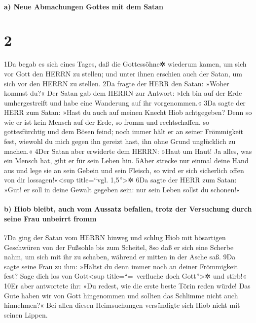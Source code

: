 \hypertarget{a-neue-abmachungen-gottes-mit-dem-satan}{%
\paragraph{a) Neue Abmachungen Gottes mit dem
Satan}\label{a-neue-abmachungen-gottes-mit-dem-satan}}

\hypertarget{section-1}{%
\section{2}\label{section-1}}

1Da begab es sich eines Tages, daß die Gottessöhne✲ wiederum kamen, um
sich vor Gott den HERRN zu stellen; und unter ihnen erschien auch der
Satan, um sich vor den HERRN zu stellen. 2Da fragte der HERR den Satan:
»Woher kommst du?« Der Satan gab dem HERRN zur Antwort: »Ich bin auf der
Erde umhergestreift und habe eine Wanderung auf ihr vorgenommen.« 3Da
sagte der HERR zum Satan: »Hast du auch auf meinen Knecht Hiob
achtgegeben? Denn so wie er ist kein Mensch auf der Erde, so fromm und
rechtschaffen, so gottesfürchtig und dem Bösen feind; noch immer hält er
an seiner Frömmigkeit fest, wiewohl du mich gegen ihn gereizt hast, ihn
ohne Grund unglücklich zu machen.« 4Der Satan aber erwiderte dem HERRN:
»Haut um Haut! Ja alles, was ein Mensch hat, gibt er für sein Leben hin.
5Aber strecke nur einmal deine Hand aus und lege sie an sein Gebein und
sein Fleisch, so wird er sich sicherlich offen von dir
lossagen!«\textless sup title=``vgl. 1,5''\textgreater✲ 6Da sagte der
HERR zum Satan: »Gut! er soll in deine Gewalt gegeben sein: nur sein
Leben sollst du schonen!«

\hypertarget{b-hiob-bleibt-auch-vom-aussatz-befallen-trotz-der-versuchung-durch-seine-frau-unbeirrt-fromm}{%
\paragraph{b) Hiob bleibt, auch vom Aussatz befallen, trotz der
Versuchung durch seine Frau unbeirrt
fromm}\label{b-hiob-bleibt-auch-vom-aussatz-befallen-trotz-der-versuchung-durch-seine-frau-unbeirrt-fromm}}

7Da ging der Satan vom HERRN hinweg und schlug Hiob mit bösartigen
Geschwüren von der Fußsohle bis zum Scheitel, 8so daß er sich eine
Scherbe nahm, um sich mit ihr zu schaben, während er mitten in der Asche
saß. 9Da sagte seine Frau zu ihm: »Hältst du denn immer noch an deiner
Frömmigkeit fest? Sage dich los von Gott\textless sup
title=``=~verfluche doch Gott''\textgreater✲ und stirb!« 10Er aber
antwortete ihr: »Du redest, wie die erste beste Törin reden würde! Das
Gute haben wir von Gott hingenommen und sollten das Schlimme nicht auch
hinnehmen?« Bei allen diesen Heimsuchungen versündigte sich Hiob nicht
mit seinen Lippen.

